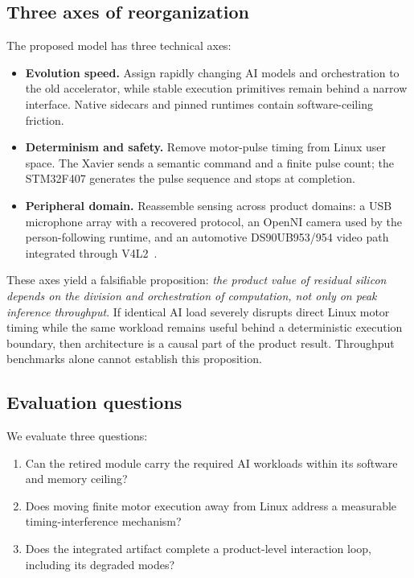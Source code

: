 \documentclass[conference]{IEEEtran}
\begin{document}
\subsection{Three axes of reorganization}
The proposed model has three technical axes:
\begin{itemize}
\item \textbf{Evolution speed.} Assign rapidly changing AI models and orchestration to the old accelerator, while stable execution primitives remain behind a narrow interface. Native sidecars and pinned runtimes contain software-ceiling friction.
\item \textbf{Determinism and safety.} Remove motor-pulse timing from Linux user space. The Xavier sends a semantic command and a finite pulse count; the STM32F407 generates the pulse sequence and stops at completion.
\item \textbf{Peripheral domain.} Reassemble sensing across product domains: a USB microphone array with a recovered protocol, an OpenNI camera used by the person-following runtime, and an automotive DS90UB953/954 video path integrated through V4L2~\cite{ti_ds90ub954}.
\end{itemize}

These axes yield a falsifiable proposition: \emph{the product value of residual silicon depends on the division and orchestration of computation, not only on peak inference throughput}. If identical AI load severely disrupts direct Linux motor timing while the same workload remains useful behind a deterministic execution boundary, then architecture is a causal part of the product result. Throughput benchmarks alone cannot establish this proposition.

\subsection{Evaluation questions}
We evaluate three questions:
\begin{enumerate}
\item[\textbf{Q1}] Can the retired module carry the required AI workloads within its software and memory ceiling?
\item[\textbf{Q2}] Does moving finite motor execution away from Linux address a measurable timing-interference mechanism?
\item[\textbf{Q3}] Does the integrated artifact complete a product-level interaction loop, including its degraded modes?
\end{enumerate}
\end{document}
